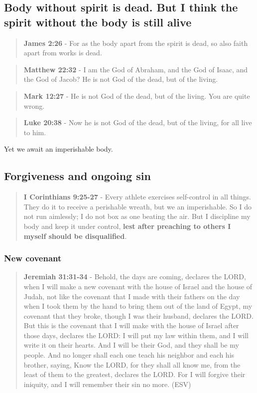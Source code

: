 \documentclass[11pt]{article}
\begin{document}
\subsection{Body without spirit is dead. But I think the spirit without the body is still alive}
\label{sec:orgb4c3d40}
\begin{quote}
\textbf{James 2:26} - For as the body apart from the spirit is dead, so also faith apart from works is dead.
\end{quote}

\begin{quote}
\textbf{Matthew 22:32} - I am the God of Abraham, and the God of Isaac, and the God of Jacob? He is not God of the dead, but of the living.
\end{quote}

\begin{quote}
\textbf{Mark 12:27} - He is not God of the dead, but of the living. You are quite wrong.
\end{quote}

\begin{quote}
\textbf{Luke 20:38} - Now he is not God of the dead, but of the living, for all live to him.
\end{quote}

Yet we await an imperishable body.

\subsection{Forgiveness and ongoing sin}
\label{sec:org15eb944}
\begin{quote}
\textbf{I Corinthians 9:25-27} - Every athlete exercises self-control in all things. They do it to receive a perishable wreath, but we an imperishable. So I do not run aimlessly; I do not box as one beating the air. But I discipline my body and keep it under control, \textbf{lest after preaching to others I myself should be disqualified}.
\end{quote}

\subsubsection{New covenant}
\label{sec:orgc8b56c2}
\begin{quote}
\textbf{Jeremiah 31:31-34} - Behold, the days are coming, declares the LORD, when I will make a new covenant with the house of Israel and the house of Judah, not like the covenant that I made with their fathers on the day when I took them by the hand to bring them out of the land of Egypt, my covenant that they broke, though I was their husband, declares the LORD. But this is the covenant that I will make with the house of Israel after those days, declares the LORD: I will put my law within them, and I will write it on their hearts. And I will be their God, and they shall be my people. And no longer shall each one teach his neighbor and each his brother, saying, Know the LORD, for they shall all know me, from the least of them to the greatest, declares the LORD. For I will forgive their iniquity, and I will remember their sin no more. (ESV)
\end{quote}
\end{document}
